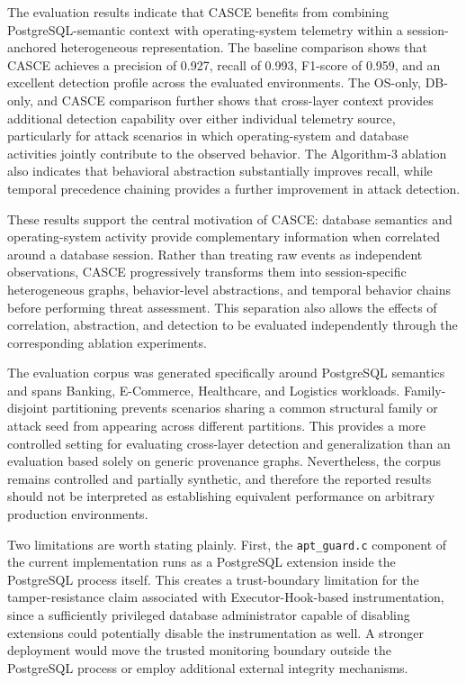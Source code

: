 \documentclass[conference]{IEEEtran}
\begin{document}
The evaluation results indicate that CASCE benefits from combining
PostgreSQL-semantic context with operating-system telemetry within a
session-anchored heterogeneous representation. The baseline comparison
shows that CASCE achieves a precision of 0.927, recall of 0.993, F1-score
of 0.959, and an excellent detection profile across the evaluated environments.
The OS-only, DB-only, and CASCE comparison further shows that cross-layer
context provides additional detection capability over either individual
telemetry source, particularly for attack scenarios in which operating-system
and database activities jointly contribute to the observed behavior.
The Algorithm-3 ablation also indicates that behavioral abstraction
substantially improves recall, while temporal precedence chaining provides
a further improvement in attack detection.

These results support the central motivation of CASCE: database semantics
and operating-system activity provide complementary information when
correlated around a database session. Rather than treating raw events as
independent observations, CASCE progressively transforms them into
session-specific heterogeneous graphs, behavior-level abstractions, and
temporal behavior chains before performing threat assessment. This
separation also allows the effects of correlation, abstraction, and
detection to be evaluated independently through the corresponding
ablation experiments.

The evaluation corpus was generated specifically around PostgreSQL
semantics and spans Banking, E-Commerce, Healthcare, and Logistics workloads. 
Family-disjoint partitioning prevents scenarios sharing a common structural family or
attack seed from appearing across different partitions. This provides a
more controlled setting for evaluating cross-layer detection and
generalization than an evaluation based solely on generic provenance
graphs. Nevertheless, the corpus remains controlled and partially
synthetic, and therefore the reported results should not be interpreted
as establishing equivalent performance on arbitrary production
environments.

Two limitations are worth stating plainly. First, the
\texttt{apt\_guard.c} component of the current implementation runs as a
PostgreSQL extension inside the PostgreSQL process itself. This creates a
trust-boundary limitation for the tamper-resistance claim associated with
Executor-Hook-based instrumentation, since a sufficiently privileged
database administrator capable of disabling extensions could potentially
disable the instrumentation as well. A stronger deployment would move
the trusted monitoring boundary outside the PostgreSQL process or employ
additional external integrity mechanisms.
\end{document}
